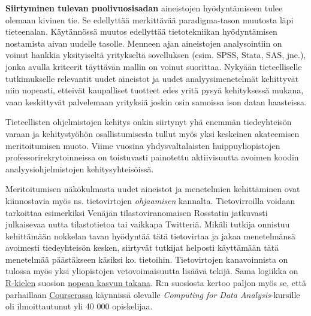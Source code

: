 \textbf{Siirtyminen tulevan puolivuosisadan} aineistojen hyödyntämiseen
tulee olemaan kivinen tie. Se edellyttää merkittävää paradigma-tason
muutosta läpi tieteenalan. Käytännössä muutos edellyttää tietotekniikan
hyödyntämisen nostamista aivan uudelle tasolle. Menneen ajan aineistojen
analysointiin on voinut hankkia yksityiseltä yritykseltä sovelluksen
(esim. SPSS, Stata, SAS, jne.), jonka avulla kriteerit täyttävän mallin
on voinut suorittaa. Nykyään tieteelliselle tutkimukselle relevantit
uudet aineistot ja uudet analyysimenetelmät kehittyvät niin nopeasti,
etteivät kaupalliset tuotteet edes yritä pysyä kehityksessä mukana, vaan
keskittyvät palvelemaan yrityksiä joskin osin samoissa ison datan
haasteissa.

Tieteellisten ohjelmistojen kehitys onkin siirtynyt yhä enemmän
tiedeyhteisön varaan ja kehitystyöhön osallistumisesta tullut myös yksi
keskeinen akateemisen meritoitumisen muoto. Viime vuosina
yhdysvaltalaisten huippuyliopistojen professorirekrytoinneissa on
toistuvasti painotettu aktiivisuutta avoimen koodin
analyysiohjelmistojen kehitysyhteisöissä.

Meritoitumisen näkökulmasta uudet aineistot ja menetelmien kehittäminen
ovat kiinnostavia myös ns. tietovirtojen \emph{ohjaamisen} kannalta.
Tietovirroilla voidaan tarkoittaa esimerkiksi Venäjän
tilastoviranomaisen Rosstatin jatkuvasti julkaisevaa uutta tilastotietoa
tai vaikkapa Twitteriä. Mikäli tutkija onnistuu kehittämään nokkelan
tavan hyödyntää tätä tietovirtaa ja jakaa menetelmänsä avoimesti
tiedeyhteisön kesken, siirtyvät tutkijat helposti käyttämään tätä
menetelmää päästäkseen käsiksi ko. tietoihin. Tietovirtojen
kanavoinnista on tulossa myös yksi yliopistojen vetovoimaisuutta lisäävä
tekijä. Sama logiikka on \href{http://www.r-project.org/}{R-kielen}
suosion \href{http://r4stats.com/articles/popularity/}{nopean kasvun
takana}. R:n suosiosta kertoo paljon myös se, että parhaillaan
\href{https://www.coursera.org/}{Courserassa} käynnissä olevalle
\emph{Computing for Data Analysis}-kursille oli ilmoittautunut yli 40
000 opiskelijaa.

